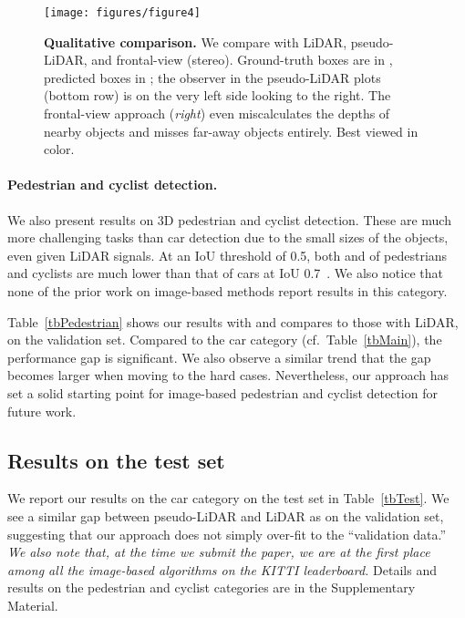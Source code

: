 \begin{figure*}[t]
	\centerline{\texttt{[image: figures/figure4]}}
	\caption{\textbf{Qualitative comparison.} We compare \AVOD with LiDAR, pseudo-LiDAR, and frontal-view (stereo). Ground-truth boxes are in {\color{red}{red}}, predicted boxes in {\color{green}{green}}; the observer in the pseudo-LiDAR plots (bottom row) is on the very left side looking to the right.  The frontal-view approach (\emph{right}) even  miscalculates the depths of nearby objects and misses far-away objects entirely. Best viewed in color.}
	\label{fig:qualitative}
\end{figure*}

\paragraph{Pedestrian and cyclist detection.}
We also present results on 3D pedestrian and cyclist detection.
These are much more challenging tasks than car detection due to the small sizes of the objects, even given LiDAR signals. At an IoU threshold of 0.5, both \APBEV and \AP of pedestrians and cyclists are much lower than that of cars at IoU 0.7~\cite{qi2018frustum}. We also notice that none of the prior work on image-based methods report  results in this category.

Table~\ref{tbPedestrian} shows our results with \Frustum and compares to those with LiDAR, on the validation set. Compared to the car category (cf.~Table~\ref{tbMain}), the performance gap is significant. We also observe a similar trend that the gap becomes larger when moving to the hard cases. Nevertheless, our approach has set a solid starting point for image-based pedestrian and cyclist detection for future work.

\subsection{Results on the test set}
We report our results on the car category on the test set in Table~\ref{tbTest}. We see a similar gap between pseudo-LiDAR and LiDAR as on the validation set, suggesting that our approach does not simply over-fit to the ``validation data.'' \emph{We also note that, at the time we submit the paper, we are at the first place among all the image-based algorithms on the KITTI leaderboard.} Details and results on the pedestrian and cyclist categories are in the Supplementary Material.


